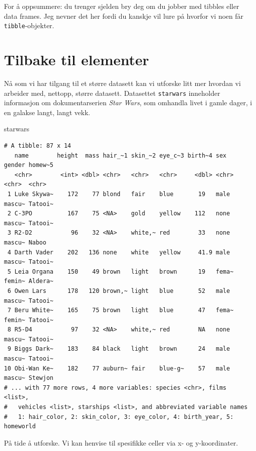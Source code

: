 \documentclass[
  letterpaper,
  DIV=11,
  numbers=noendperiod]{scrreprt}
\newenvironment{Shaded}{\begin{snugshade}}{\end{snugshade}}
\newcommand{\NormalTok}[1]{\textcolor[rgb]{0.00,0.23,0.31}{#1}}
\begin{document}
For å oppsummere: du trenger sjelden bry deg om du jobber med tibbles
eller data frames. Jeg nevner det her fordi du kanskje vil lure på
hvorfor vi noen får \texttt{tibble}-objekter.

\hypertarget{tilbake-til-elementer}{%
\section{Tilbake til elementer}\label{tilbake-til-elementer}}

Nå som vi har tilgang til et større datasett kan vi utforske litt mer
hvordan vi arbeider med, nettopp, større datasett. Datasettet
\texttt{starwars} inneholder informasjon om dokumentarserien \emph{Star
Wars}, som omhandla livet i gamle dager, i en galakse langt, langt vekk.

\begin{Shaded}
\begin{Highlighting}[]
\NormalTok{starwars}
\end{Highlighting}
\end{Shaded}

\begin{verbatim}
# A tibble: 87 x 14
   name        height  mass hair_~1 skin_~2 eye_c~3 birth~4 sex   gender homew~5
   <chr>        <int> <dbl> <chr>   <chr>   <chr>     <dbl> <chr> <chr>  <chr>  
 1 Luke Skywa~    172    77 blond   fair    blue       19   male  mascu~ Tatooi~
 2 C-3PO          167    75 <NA>    gold    yellow    112   none  mascu~ Tatooi~
 3 R2-D2           96    32 <NA>    white,~ red        33   none  mascu~ Naboo  
 4 Darth Vader    202   136 none    white   yellow     41.9 male  mascu~ Tatooi~
 5 Leia Organa    150    49 brown   light   brown      19   fema~ femin~ Aldera~
 6 Owen Lars      178   120 brown,~ light   blue       52   male  mascu~ Tatooi~
 7 Beru White~    165    75 brown   light   blue       47   fema~ femin~ Tatooi~
 8 R5-D4           97    32 <NA>    white,~ red        NA   none  mascu~ Tatooi~
 9 Biggs Dark~    183    84 black   light   brown      24   male  mascu~ Tatooi~
10 Obi-Wan Ke~    182    77 auburn~ fair    blue-g~    57   male  mascu~ Stewjon
# ... with 77 more rows, 4 more variables: species <chr>, films <list>,
#   vehicles <list>, starships <list>, and abbreviated variable names
#   1: hair_color, 2: skin_color, 3: eye_color, 4: birth_year, 5: homeworld
\end{verbatim}

På tide å utforske. Vi kan henvise til spesifikke celler via x- og
y-koordinater.
\end{document}
